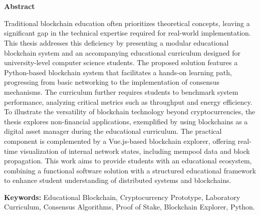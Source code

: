 \chapter*{}
\begin{center}
\label{abstract}
\textbf{Abstract}
\end{center}
Traditional blockchain education often prioritizes theoretical concepts, leaving a significant gap in the technical expertise required for real-world implementation. This thesis addresses this deficiency by presenting a modular educational blockchain system and an accompanying educational curriculum designed for university-level computer science students. The proposed solution features a Python-based blockchain system that facilitates a hands-on learning path, progressing from basic networking to the implementation of consensus mechanisms. The curriculum further requires students to benchmark system performance, analyzing critical metrics such as throughput and energy efficiency. To illustrate the versatility of blockchain technology beyond cryptocurrencies, the thesis explores non-financial applications, exemplified by using blockchains as a digital asset manager during the educational curriculum. The practical component is complemented by a Vue.js-based blockchain explorer, offering real-time visualization of internal network states, including mempool data and block propagation. This work aims to provide students with an educational ecosystem, combining a functional software solution with a structured educational framework to enhance student understanding of distributed systems and blockchains.\vspace{0.3cm}

\textbf{Keywords:} Educational Blockchain, Cryptocurrency Prototype, Laboratory Curriculum, Consensus Algorithms, Proof of Stake, Blockchain Explorer, Python.